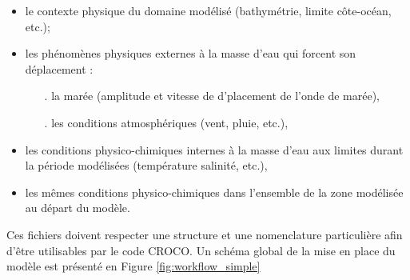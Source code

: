 \documentclass[10pt,a4paper,titlepage]{article}
\begin{document}
\begin{itemize}
    \item le contexte physique du domaine modélisé (bathymétrie, limite côte-océan, etc.);
    \item les phénomènes physiques externes à la masse d'eau qui forcent son déplacement :
    \begin{itemize}
        \item[.] la marée (amplitude et vitesse de d'placement de l'onde de marée),
        \item[.] les conditions atmosphériques (vent, pluie, etc.),
    \end{itemize}
    \item les conditions physico-chimiques internes à la masse d'eau aux limites durant la période modélisées (température salinité, etc.),
    \item les mêmes conditions physico-chimiques dans l'ensemble de la zone modélisée au départ du modèle.
\end{itemize}
Ces fichiers doivent respecter une structure et une nomenclature particulière afin d'être utilisables par le code CROCO.
Un schéma global de la mise en place du modèle est présenté en Figure \ref{fig:workflow_simple}
\end{document}
